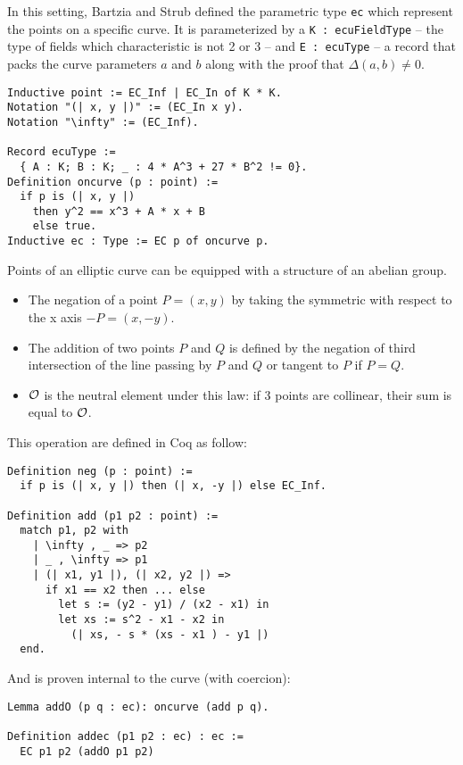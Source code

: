In this setting, Bartzia and Strub defined the parametric type \texttt{ec} which
represent the points on a specific curve. It is parameterized by
a \texttt{K : ecuFieldType} -- the type of fields which characteristic is not 2 or 3 --
and \texttt{E : ecuType} -- a record that packs the curve parameters $a$ and $b$
along with the proof that $\Delta(a,b) \neq 0$.
\begin{lstlisting}[language=Coq]
Inductive point := EC_Inf | EC_In of K * K.
Notation "(| x, y |)" := (EC_In x y).
Notation "\infty" := (EC_Inf).

Record ecuType :=
  { A : K; B : K; _ : 4 * A^3 + 27 * B^2 != 0}.
Definition oncurve (p : point) :=
  if p is (| x, y |)
    then y^2 == x^3 + A * x + B
    else true.
Inductive ec : Type := EC p of oncurve p.
\end{lstlisting}

Points of an elliptic curve can be equipped with a structure of an abelian group.
\begin{itemize}
  \item The negation of a point $P = (x,y)$ by taking the symmetric with respect to the x axis $-P = (x, -y)$.
  \item The addition of two points $P$ and $Q$ is defined by the negation of third intersection
  of the line passing by $P$ and $Q$ or tangent to $P$ if $P = Q$.
  \item $\mathcal{O}$ is the neutral element under this law: if 3 points are collinear, their sum is equal to $\mathcal{O}$.
\end{itemize}

This operation are defined in Coq as follow:
\begin{lstlisting}[language=Coq]
Definition neg (p : point) :=
  if p is (| x, y |) then (| x, -y |) else EC_Inf.

Definition add (p1 p2 : point) :=
  match p1, p2 with
    | \infty , _ => p2
    | _ , \infty => p1
    | (| x1, y1 |), (| x2, y2 |) =>
      if x1 == x2 then ... else
        let s := (y2 - y1) / (x2 - x1) in
        let xs := s^2 - x1 - x2 in
          (| xs, - s * (xs - x1 ) - y1 |)
  end.
\end{lstlisting}

And is proven internal to the curve (with coercion):
\begin{lstlisting}[language=Coq]
Lemma addO (p q : ec): oncurve (add p q).

Definition addec (p1 p2 : ec) : ec :=
  EC p1 p2 (addO p1 p2)
\end{lstlisting}

